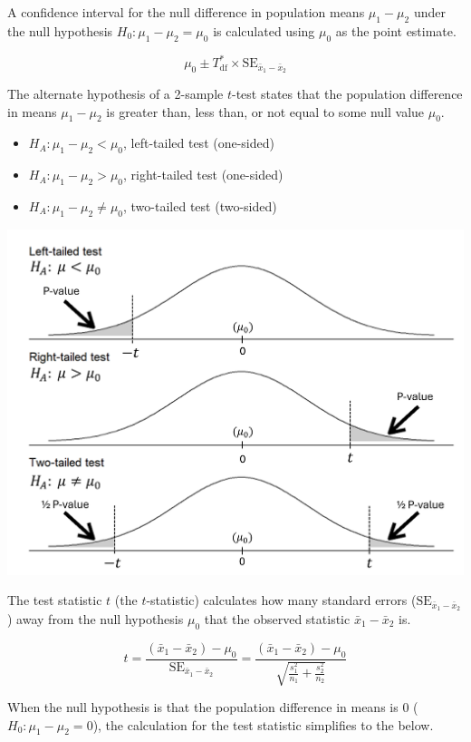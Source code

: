 \documentclass[
  letterpaper,
  DIV=11,
  numbers=noendperiod]{scrartcl}
\begin{document}
A confidence interval for the null difference in population means
\(\mu_1-\mu_2\) under the null hypothesis
\(H_0 \colon \mu_1-\mu_2=\mu_0\) is calculated using \(\mu_0\) as the
point estimate.

\[
\mu_0 \pm T_{\text{df}}^* \times \text{SE}_{\bar{x}_1-\bar{x}_2}
\]

The alternate hypothesis of a 2-sample \(t\)-test states that the
population difference in means \(\mu_1-\mu_2\) is greater than, less
than, or not equal to some null value \(\mu_0\).

\begin{itemize}
\item
  \(H_A \colon \mu_1-\mu_2 < \mu_0\), left-tailed test (one-sided)
\item
  \(H_A \colon \mu_1-\mu_2 > \mu_0\), right-tailed test (one-sided)
\item
  \(H_A \colon \mu_1-\mu_2 \ne \mu_0\), two-tailed test (two-sided)
\end{itemize}

\includegraphics{cheatsheet_files/mediabag/t-test.png}

The test statistic \(t\) (the \(t\)-statistic) calculates how many
standard errors (\(\text{SE}_{\bar{x}_1-\bar{x}_2}\)) away from the null
hypothesis \(\mu_0\) that the observed statistic \(\bar{x}_1-\bar{x}_2\)
is.

\[
t=\frac{(\bar{x}_1-\bar{x}_2)-\mu_0}{\text{SE}_{\bar{x}_1-\bar{x}_2}}=\frac{(\bar{x}_1-\bar{x}_2)-\mu_0}{\sqrt{\frac{s_1^2}{n_1}+\frac{s_2^2}{n_2}}}
\]

When the null hypothesis is that the population difference in means is 0
(\(H_0 \colon \mu_1-\mu_2=0\)), the calculation for the test statistic
simplifies to the below.
\end{document}
